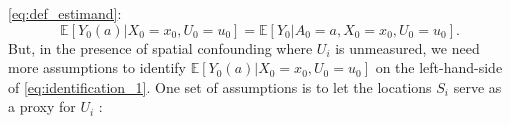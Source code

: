 \documentclass[12pt]{article}
\newcommand{\E}{\mathbb{E}}
\newcommand{\CP}[1]{{\color{purple}From Chan: #1}}
\newcommand{\XL}[1]{{\color{blue}from Xindi: #1}}
\begin{document}
\eqref{eq:def_estimand}:
\begin{equation}\label{eq:identification_1}
    \E[Y_0(a)| X_0 = x_0,U_0 = u_0] = \E[Y_0| A_0 = a, X_0 = x_0,U_0 = u_0]. 
\end{equation}
\noindent 
But, in the presence of spatial confounding where $U_i$ is unmeasured, we need more assumptions to identify $ \E[Y_0(a)| X_0 = x_0,U_0 = u_0]$ on the left-hand-side of \eqref{eq:identification_1}. One set of assumptions is to let the locations $S_i$ serve as a proxy for $U_i$ \citep{gilbert2021causal,wiecha2024two, gilbert2024consistency}: 
\end{document}
